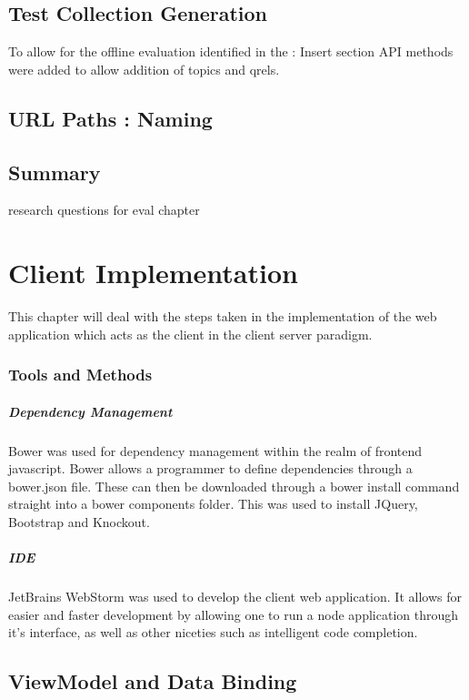 \documentclass{l4proj}
\begin{document}
\section{Test Collection Generation}
To allow for the offline evaluation identified in the : Insert section API methods were added to allow addition of topics and qrels.

\section{URL Paths : Naming}

\section{Summary}
research questions for eval chapter

\chapter{Client Implementation}
This chapter will deal with the steps taken in the implementation of the web application which acts as the client in the client server paradigm.

\subsection{Tools and Methods}
\paragraph{Dependency Management}
Bower was used for dependency management within the realm of frontend javascript. Bower allows a programmer to define dependencies through a bower.json file. These can then be downloaded through a bower install command straight into a bower components folder. This was used to install JQuery, Bootstrap and Knockout.

\paragraph{IDE}
JetBrains WebStorm was used to develop the client web application. It allows for easier and faster development by allowing one to run a node application through it's interface, as well as other niceties such as intelligent code completion.

\section{ViewModel and Data Binding}
\end{document}

